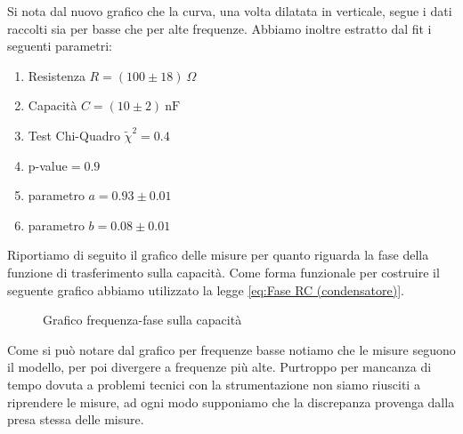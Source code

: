\documentclass[letterpaper,12pt]{article}
\begin{document}
Si nota dal nuovo grafico che la curva, una volta dilatata in verticale, segue i dati raccolti sia per basse che per alte frequenze.
Abbiamo inoltre estratto dal fit i seguenti parametri:

\begin{enumerate}
    \item Resistenza $R = (100\pm18)\ \Omega$
    \item Capacità $ C = (10\pm2)\ \text{nF}$
    \item Test Chi-Quadro  $\widetilde{\chi}^2 = 0.4 $
    \item p-value$= 0.9 $
    \item parametro $a = 0.93\pm0.01 $
    \item parametro $b = 0.08\pm0.01$
\end{enumerate}

Riportiamo di seguito il grafico delle misure per quanto riguarda la fase della funzione di trasferimento sulla capacità. Come forma funzionale per costruire il seguente grafico abbiamo utilizzato la legge \ref{eq:Fase RC (condensatore)}.

\begin{figure}[h!]
    \centering
    \caption{Grafico frequenza-fase sulla capacità  }
    \label{fig:RC_C_fase}
\end{figure}

Come si può notare dal grafico per frequenze basse notiamo che le misure seguono il modello, per poi divergere a frequenze più alte. Purtroppo per mancanza di tempo dovuta a problemi tecnici con la strumentazione non siamo riusciti a riprendere le misure, ad ogni modo supponiamo che la discrepanza provenga dalla presa stessa delle misure. 
\end{document}
